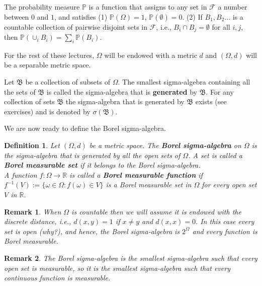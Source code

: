 \documentclass[letter,11pt]{article}
\newtheorem{definition}{Definition}[section]
\newtheorem{remark}{Remark}[section]
\begin{document}
The probability measure $\mathbb{P}$ is a function that assigns to any set in $\mathcal{F}$ a number between $0$ and $1$, and satisfies  (1) $\mathbb{P}(\Omega)=1$, $\mathbb{P}(\emptyset) =0$. (2)  If $B_{1},B_{2}\ldots$ is a countable collection of pairwise disjoint sets in $\mathcal{F}$, i.e., $B_{i} \cap B_{j} = \emptyset$ for all $i,j$, then $ \mathbb{P} (\cup _{i} B_{i} ) = \sum _{i} \mathbb{P} (B_{i})$. 

For the rest of these lectures, $\Omega$ will be endowed with a metric $d$ and $(\Omega,d)$ will be a separable metric space. 


Let $\mathfrak{B}$ be a collection of subsets of $\Omega$. The smallest sigma-algebra containing all the sets of $\mathfrak{B}$ is called the sigma-algebra that is \textbf{generated} by  $\mathfrak{B}$. For any collection of sets $\mathfrak{B}$ the sigma-algebra that is generated by  $\mathfrak{B}$ exists (see exercises) and is denoted by $\sigma (\mathfrak{B}) $. 

We are now ready to define the Borel sigma-algebra. 


 \begin{definition}
 Let $(\Omega,d)$ be a metric space. The \textbf{Borel sigma-algebra} on $\Omega$ is the sigma-algebra that is generated by all the open sets of $\Omega$. A set is called a \textbf{Borel measurable set} if it belongs to the Borel sigma-algebra. \\ A function $f: \Omega \rightarrow \mathbb{R}$ is called a \textbf{Borel measurable function} if $f^{-1}(V) := \{ \omega \in \Omega : f(\omega) \in V \}$ is a Borel  measurable set in $\Omega$ for every open set $V$ in $\mathbb{R}$. 
  \end{definition} 

  

 \begin{remark}
 When $\Omega $ is countable then we will assume it is endowed with the discrete distance, i.e., $d(x,y)=1$ if $x \neq y$ and $d(x,x)=0$. In this case every set is open (why?), and hence, the Borel sigma-algebra is $2^{\Omega}$ and every function is Borel measurable. 
 \end{remark}

 \begin{remark}
   The Borel sigma-algebra is the smallest sigma-algebra such that every open set is measurable, so it is the smallest sigma-algebra such that every continuous function is measurable. 
 \end{remark}
\end{document}
